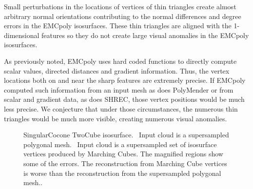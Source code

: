 Small perturbations in the locations of vertices 
of thin triangles
create almost arbitrary normal orientations
contributing to the normal differences and degree errors
in the EMCpoly isosurfaces.
These thin triangles are aligned with the 1-dimensional features
so they do not create large visual anomalies in the EMCpoly isosurfaces.

As previously noted, EMCpoly uses hard coded functions
to directly compute scalar values,
directed distances and gradient information.
Thus, the vertex locations both on and near the sharp features
are extremely precise.
If EMCpoly computed such information from an input mesh as does PolyMender
or from scalar and gradient data, as does SHREC,
those vertex positions would be much less precise.
We conjecture that under those circumstances,
the numerous thin triangles would be much more visible,
creating numerous visual anomalies.


\begin{figure}[t] 
	\centering 

\caption{SingularCocone TwoCube isosurface. 
\protect{}~Input cloud is a supersampled polygonal mesh. 
\protect{}~Input cloud is a supersampled
set of isosurface vertices produced by Marching Cubes.
The magnified regions show some of the errors. 
The reconstruction from Marching Cube vertices is worse 
than the reconstruction from the supersampled polygonal mesh.. }
	\label{fig:cocone_compare_from_perfect_1}
	\vskip-0.2cm
\end{figure} 



